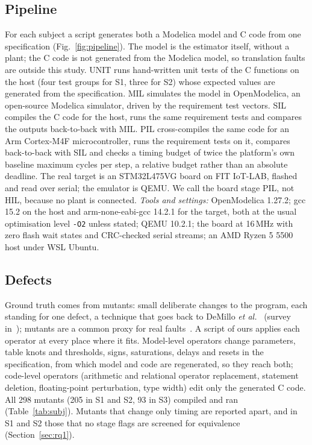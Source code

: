 \documentclass[conference]{IEEEtran}
\begin{document}
\subsection{Pipeline}
For each subject a script generates both a Modelica model and C code from one specification
(Fig.~\ref{fig:pipeline}). The model is the estimator itself, without a plant; the C code is not generated
from the Modelica model, so translation faults are outside this study. UNIT runs hand-written unit tests of
the C functions on the host (four test groups for S1, three for S2) whose expected values are generated from
the specification. MIL simulates the model in OpenModelica, an open-source Modelica simulator, driven by the
requirement test vectors. SIL compiles the C code for the host, runs the same requirement tests and compares
the outputs back-to-back with MIL. PIL cross-compiles the same code for an Arm Cortex-M4F microcontroller,
runs the requirement tests on it, compares back-to-back with SIL and checks a timing budget of twice the
platform's own baseline maximum cycles per step, a relative budget rather than an absolute deadline. The
real target is an STM32L475VG board on FIT IoT-LAB, flashed and read over serial; the emulator is QEMU. We
call the board stage PIL, not HIL, because no plant is connected. \emph{Tools and settings:} OpenModelica
1.27.2; gcc 15.2 on the host and arm-none-eabi-gcc 14.2.1 for the target, both at the usual optimisation
level \texttt{-O2} unless stated; QEMU 10.2.1; the board at 16\,MHz with zero flash wait states and
CRC-checked serial streams; an AMD Ryzen 5 5500 host under WSL Ubuntu.

\subsection{Defects}
Ground truth comes from mutants: small deliberate changes to the program, each standing for one defect, a
technique that goes back to DeMillo \emph{et al.}~\cite{demillo1978} (survey in~\cite{jia2011}); mutants are
a common proxy for real faults~\cite{just2014}. A script of ours applies each operator at every place where it
fits. Model-level operators change parameters, table knots and thresholds, signs, saturations, delays and
resets in the specification,
from which model and code are regenerated, so they reach both; code-level operators (arithmetic and relational
operator replacement, statement deletion, floating-point perturbation, type width) edit only the generated C
code. All 298 mutants (205 in S1 and S2, 93 in S3) compiled and ran (Table~\ref{tab:subj}). Mutants that
change only timing are reported apart, and in S1 and S2 those that no stage flags are screened for equivalence
(Section~\ref{sec:rq1}).
\end{document}
